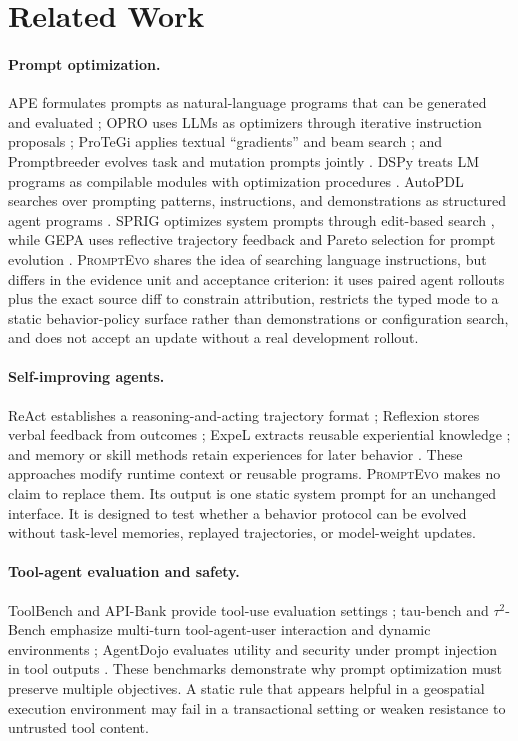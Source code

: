 \documentclass[10pt]{article}
\newcommand{\method}{\textsc{PromptEvo}}
\begin{document}
\section{Related Work}
\paragraph{Prompt optimization.} APE formulates prompts as natural-language programs that can be generated and evaluated \cite{ape}; OPRO uses LLMs as optimizers through iterative instruction proposals \cite{opro}; ProTeGi applies textual ``gradients'' and beam search \cite{protegi}; and Promptbreeder evolves task and mutation prompts jointly \cite{promptbreeder}. DSPy treats LM programs as compilable modules with optimization procedures \cite{dspy}. AutoPDL searches over prompting patterns, instructions, and demonstrations as structured agent programs \cite{autopdl}. SPRIG optimizes system prompts through edit-based search \cite{sprig}, while GEPA uses reflective trajectory feedback and Pareto selection for prompt evolution \cite{gepa}. \method{} shares the idea of searching language instructions, but differs in the evidence unit and acceptance criterion: it uses paired agent rollouts plus the exact source diff to constrain attribution, restricts the typed mode to a static behavior-policy surface rather than demonstrations or configuration search, and does not accept an update without a real development rollout.

\paragraph{Self-improving agents.} ReAct establishes a reasoning-and-acting trajectory format \cite{react}; Reflexion stores verbal feedback from outcomes \cite{reflexion}; ExpeL extracts reusable experiential knowledge \cite{expel}; and memory or skill methods retain experiences for later behavior \cite{memrl,autoskill}. These approaches modify runtime context or reusable programs. \method{} makes no claim to replace them. Its output is one static system prompt for an unchanged interface. It is designed to test whether a behavior protocol can be evolved without task-level memories, replayed trajectories, or model-weight updates.

\paragraph{Tool-agent evaluation and safety.} ToolBench and API-Bank provide tool-use evaluation settings \cite{toolllm,apibank}; tau-bench and $\tau^2$-Bench emphasize multi-turn tool-agent-user interaction and dynamic environments \cite{taubench,tau2}; AgentDojo evaluates utility and security under prompt injection in tool outputs \cite{agentdojo}. These benchmarks demonstrate why prompt optimization must preserve multiple objectives. A static rule that appears helpful in a geospatial execution environment may fail in a transactional setting or weaken resistance to untrusted tool content.
\end{document}
